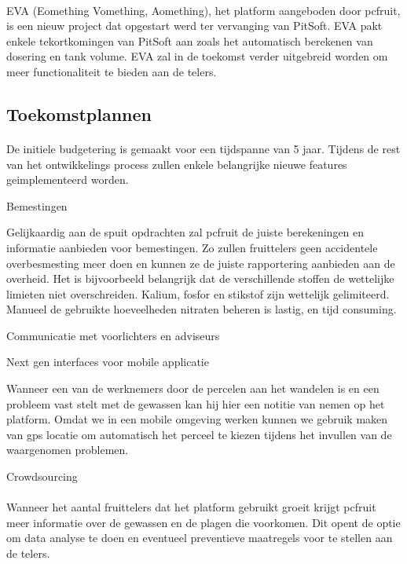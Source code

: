 \paragraph {} EVA (Eomething Vomething, Aomething), het platform aangeboden door pcfruit,
is een nieuw project dat opgestart werd ter vervanging van PitSoft. EVA pakt enkele
tekortkomingen van PitSoft aan zoals het automatisch berekenen van dosering en tank
volume. EVA zal in de toekomst verder uitgebreid worden om meer functionaliteit te bieden
aan de telers.

\subsection {Toekomstplannen}

\paragraph {} De initiele budgetering is gemaakt voor een tijdspanne van 5 jaar. Tijdens de rest van
het ontwikkelings process zullen enkele belangrijke nieuwe features geimplementeerd
worden.

Bemestingen

Gelijkaardig aan de spuit opdrachten zal pcfruit de juiste berekeningen en informatie
aanbieden voor bemestingen. Zo zullen fruittelers geen accidentele overbesmesting meer doen en
kunnen ze de juiste rapportering aanbieden aan de overheid. Het is bijvoorbeeld
belangrijk dat de verschillende stoffen de wettelijke limieten niet overschreiden.
Kalium, fosfor en stikstof zijn wettelijk gelimiteerd. Manueel de gebruikte hoeveelheden
nitraten beheren is lastig, en tijd consuming.

Communicatie met voorlichters en adviseurs

Next gen interfaces voor mobile applicatie

Wanneer een van de werknemers door de percelen aan het wandelen is en een probleem vast
stelt met de gewassen kan hij hier een notitie van nemen op het platform. Omdat we in een
mobile omgeving werken kunnen we gebruik maken van gps locatie om automatisch het perceel
te kiezen tijdens het invullen van de waargenomen problemen.

Crowdsourcing

\paragraph {} Wanneer het aantal fruittelers dat het platform gebruikt groeit krijgt pcfruit
meer informatie over de gewassen en de plagen die voorkomen. Dit opent de optie om data
analyse te doen en eventueel preventieve maatregels voor te stellen aan de telers.

